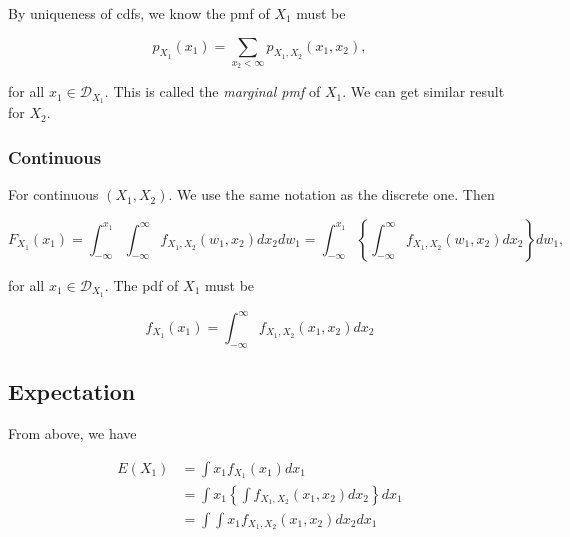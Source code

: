 \documentclass{article}
\begin{document}
                By uniqueness of cdfs, we know the pmf of $ X_{1} $ must be

                \begin{equation*}
                     p_{X_{1}}(x_{1}) = \sum_{x_{2} < \infty} p_{X_{1}, X_{2}} (x_{1}, x_{2}),
                \end{equation*}

                for all $ x_{1} \in \mathcal{D}_{X_{1}} $. This is called the \textit{marginal pmf} of $ X_{1} $.
                We can get similar result for $ X_{2} $.

            \subsubsection{Continuous}

                For continuous $ (X_{1}, X_{2}) $. We use the same notation as the discrete one. Then

                \begin{equation*}
                    F_{X_{1}} (x_{1}) = \int_{ -\infty }^{ x_{1} } \int_{
                        -\infty }^{ \infty } f_{X_{1}, X_{2}} (w_{1}, x_{2}) d x_{2} d w_{1}
                        = \int_{ -\infty }^{ x_{1} } \left\{
                            \int_{ -\infty }^{ \infty } f_{X_{1}, X_{2}} (w_{1}, x_{2}) d x_{2}
                            \right\} d w_{1},
                \end{equation*}

                for all $ x_{1} \in \mathcal{D}_{X_{1}} $. The pdf of $ X_{1} $ must be

                \begin{equation*}
                     f_{X_{1}}(x_{1}) = \int_{ -\infty }^{ \infty } f_{X_{1}, X_{2}} (x_{1}, x_{2}) d x_{2}
                \end{equation*}

            \subsection{Expectation}

                From above, we have

                \begin{align*}
                    E(X_{1}) &= \int x_{1} f_{X_{1}}(x_{1}) d x_{1} \\
                             &= \int x_{1} \left\{ \int f_{X_{1}, X_{2}}(x_{1}, x_{2}) d x_{2} \right\} d x_{1} \\
                             &= \int \int x_{1} f_{X_{1}, X_{2}}(x_{1}, x_{2}) d x_{2} d x_{1}
                \end{align*}
\end{document}
